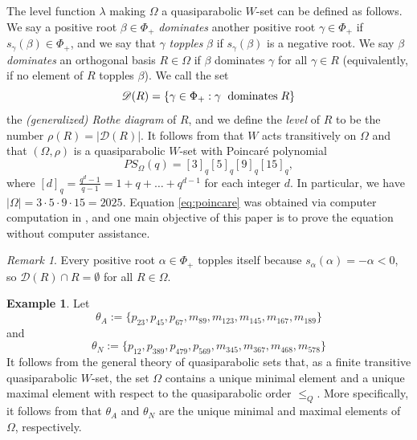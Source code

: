 \documentclass[11pt]{amsart}
\theoremstyle{plain}
\theoremstyle{definition}
\newtheorem{exa}[theorem]{Example}
\theoremstyle{remark}
\newtheorem{rmk}[theorem]{Remark}
\numberwithin{equation}{section}
\newcommand{\al}{\alpha}
\newcommand{\be}{\beta}
\newcommand{\res}{\mathscr{D}}
\newcommand{\ob}{\Omega}
\newcommand{\abs}[1]{\lvert #1 \rvert}
\begin{document}
The level function $\lambda$ making $\ob$ a quasiparabolic $W$-set can be
defined as follows. We say a positive root $\be\in \Phi_+$ \emph{dominates}
another positive root $\gamma\in \Phi_+$ if $s_\gamma(\beta)\in \Phi_+$, and we
say that $\gamma$ \emph{topples} $\beta$ if $s_\gamma(\beta)$
is a negative root. We say $\be$ \emph{dominates} an orthogonal basis $R\in \ob$
if $\be$ dominates $\gamma$ for all $\gamma \in R$ (equivalently, if no element
of $R$ topples $\be$). We call the set
\[
  \res(R)=\{\gamma\in \Phi_+: \gamma \text{\; dominates\;} R\}
\]
the {\it (generalized) Rothe diagram} of $R$, and we define the  {\it level} of
$R$ to be the number $\rho(R) = |\res(R)|$. It follows from  \cite[Theorem
4.3]{gx6} that $W$ acts transitively on $\ob$ and that $(\ob,\rho)$ is a
quasiparabolic $W$-set with Poincar\'e polynomial 
\begin{equation}
\label{eq:poincare}
PS_\ob(q)=[3]_q[5]_q[9]_q[15]_q,
\end{equation}
where $[d]_q=\frac{q^d-1}{q-1}=1+q+\dots+q^{d-1}$ for each integer $d$. In
particular, we have $\abs{\ob}=3\cdot 5\cdot 9\cdot 15=2025$. Equation
\eqref{eq:poincare} was obtained via computer computation in \cite{gx5}, and one
main objective of this paper is to prove the equation without computer assistance.

\begin{rmk}
\label{rmk:self_topple}
Every positive root $\al\in \Phi_+$ topples itself because $s_\al(\al)=-\al<0$,
so $\res(R)\cap R=\emptyset$ for all $R\in \ob$. 
\end{rmk}


\begin{exa}
  \label{exa:minmax} 
Let 
\begin{equation*}
\label{eq:theta_A}
\theta_A:=\{p_{23}, p_{45}, p_{67}, m_{89}, m_{123}, m_{145}, m_{167}, m_{189}\}
\end{equation*}
and
\begin{equation*}
\label{eq:theta_N}
\theta_N:=\{p_{12}, p_{389}, p_{479}, p_{569}, m_{345}, m_{367}, m_{468}, m_{578}\} 
\end{equation*}
It follows from the general theory of quasiparabolic sets that, as a finite
transitive quasiparabolic $W$-set, the set $\ob$ contains a unique minimal
element and a unique maximal element with respect to the quasiparabolic order
$\le_Q$. More specifically, it follows from \cite[Proposition 4.11, Proposition
6.9]{gx5} that $\theta_A$ and $\theta_N$ are the unique minimal and maximal
elements of $\ob$, respectively.  \end{exa}
\end{document}
